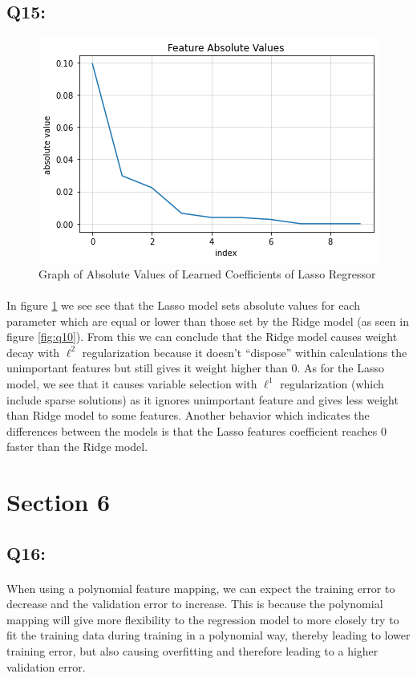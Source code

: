 \documentclass{article}
\begin{document}
\subsection*{Q15:}
    \begin{figure}[H]
        \centering
        \includegraphics[scale=0.7]{q15.png}
        \caption{Graph of Absolute Values of Learned Coefficients of Lasso Regressor}
        \label{fig:q15}
    \end{figure}
    \paragraph*{}
    In figure \ref{fig:q15} we see see that the Lasso model sets absolute values for each parameter which are equal or lower than those set by the Ridge model (as seen in figure \ref{fig:q10}). From this we can conclude that the Ridge model causes weight decay with $\ell^2$ regularization because it doesn't “dispose” within calculations the unimportant features but still gives it weight higher than 0. As for the Lasso model, we see that it causes variable selection with $\ell^1$ regularization (which include sparse solutions) as it ignores unimportant feature and gives less weight than Ridge model to some features. 
    Another behavior which indicates the differences between the models is that the Lasso features coefficient reaches 0 faster than the Ridge model.


\section*{Section 6}
\subsection*{Q16:}
    \paragraph*{}
    When using a polynomial feature mapping, we can expect the training error to decrease and the validation error to increase. This is because the polynomial mapping will give more flexibility to the regression model to more closely try to fit the training data during training in a polynomial way, thereby leading to lower training error, but also causing overfitting and therefore leading to a higher validation error.
\end{document}
